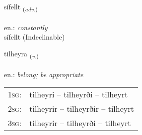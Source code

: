 \documentclass[frontgrid, backgrid]{flacards}\usepackage[]{graphicx}\usepackage[]{xcolor}
\begin{document}

\renewcommand{\flhead}{\vskip5pt \fboxsep=0pt {\small\bfseries\footnotesize Atviksorð | Adverb}}
\renewcommand{\fcfoot}{\vskip5pt \fboxsep=0pt \hspace{2pt}{\small\bfseries\footnotesize 2K}}

\renewcommand{\blhead}{\vskip5pt {\small\bfseries\footnotesize Atviksorð | Adverb }}
\renewcommand{\bcfoot}{\vskip5pt \hspace{2pt}{\small\bfseries\footnotesize 2K}}


{sífellt \small{\textsubscript{(\textit{adv.})}} \\[1ex]
\textphonetic{[siːfɛl̥t]} \\
en.: \emph{constantly} \\  [2ex]
sífellt (Indeclinable)}

\renewcommand{\flhead}{\vskip5pt \fboxsep=0pt {\small\bfseries\footnotesize Sagnorð | Verb}}
\renewcommand{\fcfoot}{\vskip5pt \fboxsep=0pt \hspace{2pt}{\small\bfseries\footnotesize 2K}}

\renewcommand{\blhead}{\vskip5pt {\small\bfseries\footnotesize Sagnorð | Verb }}
\renewcommand{\bcfoot}{\vskip5pt \hspace{2pt}{\small\bfseries\footnotesize 2K}}


{tilheyra \small{\textsubscript{(\textit{v.})}} \\[1ex] %
\textphonetic{[tʰɪlheira]} \\
en.: \emph{belong; be appropriate} \\  [2ex]
\renewcommand*{\arraystretch}{0.8}
\begin{tabular}{p{1cm}l}
\textsc{1sg}: & tilheyri -- tilheyrði -- tilheyrt \\ 
\textsc{2sg}: & tilheyrir -- tilheyrðir -- tilheyrt \\ 
\textsc{3sg}: & tilheyrir -- tilheyrði -- tilheyrt \\ 
\end{tabular}
}
\end{document}
